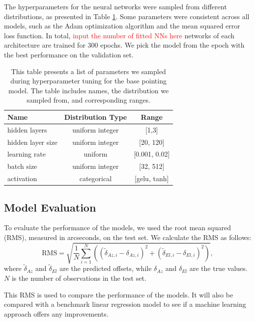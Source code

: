 The hyperparameters for the neural networks were sampled from different distributions, as presented in Table \ref{tab:nn_hyperparameters}.
Some parameters were consistent across all models, such as the Adam optimization algorithm and the mean squared error loss function.
In total, \textcolor{red}{input the number of fitted NNs here} networks of each architecture are trained for $300$ epochs.
We pick the model from the epoch with the best performance on the validation set.
\begin{table}[H]
    \centering
    \caption{This table presents a list of parameters we sampled during hyperparameter tuning for the base pointing model. The table includes names, the distribution we sampled from, and corresponding ranges.}
    \begin{tabular}{lcc}
    \hline
    \textbf{Name} & \textbf{Distribution Type} & \textbf{Range} \\ \hline
    hidden layers & uniform integer & [1,3] \\
    hidden layer size & uniform integer & [20, 120] \\
    learning rate & uniform & [0.001, 0.02] \\
    batch size & uniform integer & [32, 512] \\
    activation & categorical & [gelu, tanh] \\ \hline
    \end{tabular}
    \label{tab:nn_hyperparameters}
    \end{table}

\subsection{Model Evaluation}
To evaluate the performance of the models, we used the root mean squared (RMS), measured in arcseconds, on the test set.
We calculate the RMS as follows:
\begin{equation}
    \text{RMS} = \sqrt{ \frac{1}{N} \sum_{i=1}^N \left( (\tilde{\delta}_{Az,i} - \delta_{Az,i})^2 + (\tilde{\delta}_{El,i} - \delta_{El,i})^2 \right)},
\end{equation}
where $\tilde{\delta}_{Az}$ and $\tilde{\delta}_{El}$ are the predicted offsets, while $\delta_{Az}$ and $\delta_{El}$ are the true values.
$N$ is the number of observations in the test set.

This RMS is used to compare the performance of the models.
It will also be compared with a benchmark linear regression model to see if a machine learning approach offers any improvements.

